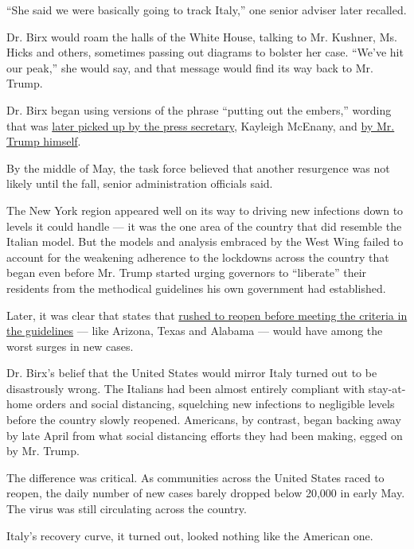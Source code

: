 ``She said we were basically going to track Italy,'' one senior adviser
later recalled.

Dr. Birx would roam the halls of the White House, talking to Mr.
Kushner, Ms. Hicks and others, sometimes passing out diagrams to bolster
her case. ``We've hit our peak,'' she would say, and that message would
find its way back to Mr. Trump.

Dr. Birx began using versions of the phrase ``putting out the embers,''
wording that was
\href{https://www.whitehouse.gov/briefings-statements/press-briefing-press-secretary-kayleigh-mcenany-062220/}{later
picked up by the press secretary}, Kayleigh McEnany, and
\href{https://twitter.com/realDonaldTrump/status/1276363261957603328?s=20}{by
Mr. Trump himself}.

By the middle of May, the task force believed that another resurgence
was not likely until the fall, senior administration officials said.

The New York region appeared well on its way to driving new infections
down to levels it could handle --- it was the one area of the country
that did resemble the Italian model. But the models and analysis
embraced by the West Wing failed to account for the weakening adherence
to the lockdowns across the country that began even before Mr. Trump
started urging governors to ``liberate'' their residents from the
methodical guidelines his own government had established.

Later, it was clear that states that
\href{https://www.nytimes3xbfgragh.onion/interactive/2020/05/07/us/coronavirus-states-reopen-criteria.html}{rushed
to reopen before meeting the criteria in the guidelines} --- like
Arizona, Texas and Alabama --- would have among the worst surges in new
cases.

Dr. Birx's belief that the United States would mirror Italy turned out
to be disastrously wrong. The Italians had been almost entirely
compliant with stay-at-home orders and social distancing, squelching new
infections to negligible levels before the country slowly reopened.
Americans, by contrast, began backing away by late April from what
social distancing efforts they had been making, egged on by Mr. Trump.

The difference was critical. As communities across the United States
raced to reopen, the daily number of new cases barely dropped below
20,000 in early May. The virus was still circulating across the country.

Italy's recovery curve, it turned out, looked nothing like the American
one.


